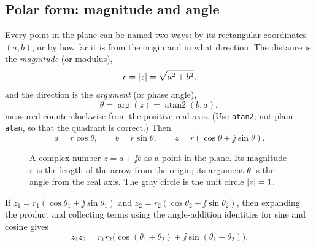 \subsection{Polar form: magnitude and angle}

Every point in the plane can be named two ways: by its rectangular coordinates $(a,b)$, or by how
far it is from the origin and in what direction. The distance is the \emph{magnitude} (or
modulus),
\[
  r = \lvert z\rvert = \sqrt{a^2 + b^2},
\]
and the direction is the \emph{argument} (or phase angle),
\[
  \theta = \arg(z) = \operatorname{atan2}(b, a),
\]
measured counterclockwise from the positive real axis. (Use \texttt{atan2}, not plain
\texttt{atan}, so that the quadrant is correct.) Then
\[
  a = r\cos\theta, \qquad b = r\sin\theta, \qquad
  z = r(\cos\theta + \jj\sin\theta).
\]

\begin{figure}[H]
\centering
{}
\caption{A complex number $z = a + \jj b$ as a point in the plane. Its magnitude $r$ is the
length of the arrow from the origin; its argument $\theta$ is the angle from the real axis. The
gray circle is the unit circle $\lvert z\rvert=1$.}
\label{ch42:fig-polar}
\end{figure}

If $z_1 = r_1(\cos\theta_1 + \jj\sin\theta_1)$
and $z_2 = r_2(\cos\theta_2 + \jj\sin\theta_2)$, then expanding the product and collecting terms
using the angle-addition identities for sine and cosine gives
\[
  z_1 z_2 = r_1 r_2\big(\cos(\theta_1 + \theta_2) + \jj\sin(\theta_1 + \theta_2)\big).
\]

